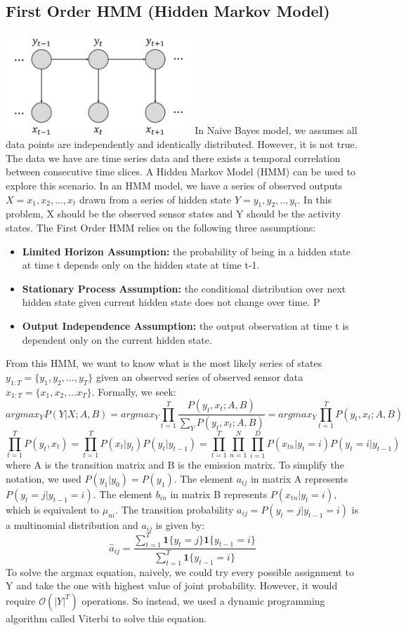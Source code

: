 \documentclass[10pt,letter]{article}
\numberwithin{equation}{section} %
\numberwithin{figure}{section} %
\numberwithin{table}{section} %
\begin{document}
\subsection{First Order HMM (Hidden Markov Model)}\includegraphics[width=7cm]{1hmm}
In Naive Bayes model, we assumes all data points are independently and identically distributed. However, it is not true. The data we have are time series data and there exists a temporal correlation between consecutive time slices. A Hidden Markov Model (HMM) can be used to explore this scenario. In an HMM model, we have a series of observed outputs $X={x_1, x_2, ...,x_t}$ drawn from a series of hidden state $Y={y_1, y_2, ..,y_t}$. In this problem, X should be the observed sensor states and Y should be the activity states. The First Order HMM relies on the following three assumptions:
\begin{itemize}
\item \textbf{Limited Horizon Assumption:} the probability of being in a hidden state at time t depends only on the hidden state at time t-1.
\item \textbf{Stationary Process Assumption:} the conditional distribution over next hidden state given current hidden state does not change over time. P
\item \textbf{Output Independence Assumption:} the output observation at time t is dependent
only on the current hidden state.
\end{itemize}
From this HMM, we want to know what is the most likely series of states  $y_{1:T} = \{y_1,y_2,...,y_T\}$ given an observed series of observed sensor data $x_{1:T} = \{x_1,x_2,...x_T\}$. Formally, we seek:
$$arg max_{Y} P(Y|X; A, B) = arg max_{Y} \prod_{t=1}^{T} \frac{P(y_t, x_t; A, B)}{\sum_{Y} P(y_t,x_t; A,B)}= arg max_{Y} \prod_{t=1}^{T} P(y_t, x_t; A, B)$$
$$ \prod_{t=1}^{T} P(y_t, x_t) = \prod_{t=1}^T P(x_t|y_t)P(y_t|y_{t-1})=\prod_{t=1}^T\prod_{n=1}^N\prod_{i=1}^D P(x_{tn}|y_t = i)P(y_t=i|y_{t-1})$$
where A is the transition matrix and B is the emission matrix. To simplify the notation, we used $P(y_1|y_0)=P(y_1)$. The element $a_{ij}$ in matrix A represents $P(y_t=j|y_{t-1}=i)$. The element $b_{in}$ in matrix B represents $P(x_{tn}|y_t=i)$, which is equivalent to $\mu_{ni}$.  The transition probability $a_{ij}=P(y_t=j|y_{t-1}=i)$ is a multinomial distribution and $a_{ij}$ is given by:
$$\hat{a}_{ij} = \frac{\sum_{t=1}^T \mathbf{1}\{y_t=j\}\mathbf{1}\{y_{t-1}=i\}}{\sum_{t=1}^T \mathbf{1}\{y_{t-1}=i\}}$$
To solve the argmax equation, naively, we could try every possible assignment to Y and take the one with highest value of joint probability. However, it would require $\mathcal{O}(|Y|^T)$ operations. So instead, we used a dynamic programming algorithm called Viterbi to solve this equation. 
\end{document}
